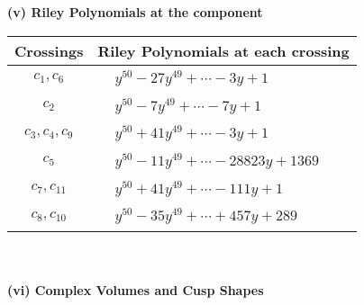\documentclass[1p]{elsarticle_modified}
\theoremstyle{definition}
\begin{document}
\newpage\renewcommand{\arraystretch}{1}
\flushleft \textbf{(v) Riley Polynomials at the component}\newline \\
\begin{tabular}{m{50pt}|m{274pt}}
Crossings & \hspace{64pt}Riley Polynomials at each crossing \\
\hline $$\begin{aligned}c_{1},c_{6}\end{aligned}$$&$\begin{aligned}
&y^{50}-27 y^{49}+\cdots-3 y+1
\end{aligned}$\\
\hline $$\begin{aligned}c_{2}\end{aligned}$$&$\begin{aligned}
&y^{50}-7 y^{49}+\cdots-7 y+1
\end{aligned}$\\
\hline $$\begin{aligned}c_{3},c_{4},c_{9}\end{aligned}$$&$\begin{aligned}
&y^{50}+41 y^{49}+\cdots-3 y+1
\end{aligned}$\\
\hline $$\begin{aligned}c_{5}\end{aligned}$$&$\begin{aligned}
&y^{50}-11 y^{49}+\cdots-28823 y+1369
\end{aligned}$\\
\hline $$\begin{aligned}c_{7},c_{11}\end{aligned}$$&$\begin{aligned}
&y^{50}+41 y^{49}+\cdots-111 y+1
\end{aligned}$\\
\hline $$\begin{aligned}c_{8},c_{10}\end{aligned}$$&$\begin{aligned}
&y^{50}-35 y^{49}+\cdots+457 y+289
\end{aligned}$\\
\hline
\end{tabular}\\~\\
\newpage\flushleft \textbf{(vi) Complex Volumes and Cusp Shapes}
\end{document}
